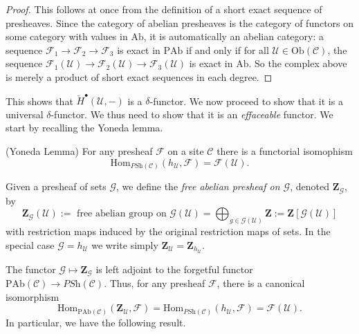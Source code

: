 \begin{proof}
This follows at once from the definition of a short exact sequence of 
presheaves. Since the category of abelian presheaves is the category of 
functors on some category with values in $\text{Ab}$, it is automatically an 
abelian category: a sequence $\mathcal{F}_1\to \mathcal{F}_2\to \mathcal{F}_3$ 
is exact in $\text{PAb}$ if and only if for all $\mathcal{U}\in 
\text{Ob}(\mathcal{C})$, the sequence $\mathcal{F}_1(\mathcal{U})\to 
\mathcal{F}_2(\mathcal{U})\to \mathcal{F}_3(\mathcal{U})$ is exact in 
$\text{Ab}$. So the complex above is merely a product of short exact sequences 
in each degree.
\end{proof}
  
\noindent
This shows that $\check{H}^\bullet(\mathcal{U}, -)$ is a $\delta$-functor. 
We now proceed to show that it is a universal $\delta$-functor. We thus need to 
show that it is an {\it effaceable} functor. We start by recalling the Yoneda 
lemma.
  
\begin{lemma}
\label{lemma-yoneda-presheaf}
(Yoneda Lemma)
For any presheaf $\mathcal{F}$ on a site $\mathcal{C}$ there is a 
functorial isomophism
$$
\text{Hom}_{\textit{PSh}(\mathcal{C})} (h_{\mathcal{U}}, \mathcal{F}) = 
\mathcal{F}(\mathcal{U}).
$$
\end{lemma}
  
\begin{definition}
\label{definition-free-abelian-presheaf}
Given a presheaf of sets $\mathcal{G}$, we define the
{\it free abelian presheaf on $\mathcal{G}$},
denoted $\mathbf{Z}_{\mathcal{G}}$, by
$$
\mathbf{Z}_{\mathcal{G}}(\mathcal{U})
:=
\text{ free abelian group on }\mathcal{G}(\mathcal{U})
=
\bigoplus_{g\in \mathcal{G}(\mathcal{U})}\mathbf{Z} 
:=
\mathbf{Z}\left[\mathcal{G}(\mathcal{U})\right]
$$
with restriction maps induced by the original restriction maps of sets. In 
the special case $\mathcal{G} = h_\mathcal{U}$ we write simply 
$\mathbf{Z}_\mathcal{U} = \mathbf{Z}_{h_\mathcal{U}}$.
\end{definition}
  
\noindent
The functor $\mathcal{G} \mapsto \mathbf{Z}_\mathcal{G}$ is left adjoint to 
the forgetful functor $\text{PAb}(\mathcal{C}) \to \textit{PSh}(\mathcal{C})$.
Thus, for any presheaf $\mathcal{F}$, there is a canonical isomorphism
$$
\text{Hom}_{\text{PAb}(\mathcal{C})}\left(
\mathbf{Z}_\mathcal{U}, \mathcal{F}
\right)
=
\text{Hom}_{\textit{PSh}(\mathcal{C})}(h_\mathcal{U}, \mathcal{F})
=
\mathcal{F}(\mathcal{U}).
$$
In particular, we have the following result.

